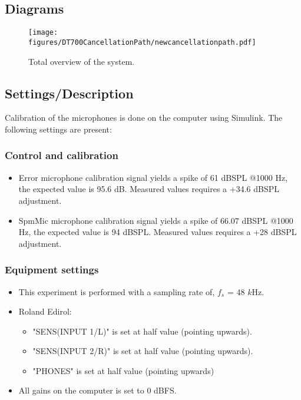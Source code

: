 \subsection{Diagrams}
\begin{figure}[H]
	\centering
	\texttt{[image: figures/DT700CancellationPath/newcancellationpath.pdf]}
	\caption{Total overview of the system.}
	\label{SchematicOverviewCP}
\end{figure}

\subsection{Settings/Description}
\label{SettingsCacellationPath}

Calibration of the microphones is done on the computer using Simulink. The following settings are present:

\subsubsection{Control and calibration}
\begin{itemize}
	\item Error microphone calibration signal yields a spike of 61 dBSPL @1000 Hz, the expected value is 95.6 dB. Measured values requires a +34.6 dBSPL adjustment.
	\item SpmMic microphone calibration signal yields a spike of 66.07 dBSPL @1000 Hz, the expected value is 94 dBSPL. Measured values requires a +28 dBSPL adjustment.
\end{itemize}


\subsubsection{Equipment settings}
\begin{itemize}
	\item This experiment is performed with a sampling rate of, $f_{s}$ = 48 $k$Hz.
	\item Roland Edirol:
		\begin{itemize}
			\item "SENS(INPUT 1/L)" is set at half value (pointing upwards).
			\item "SENS(INPUT 2/R)" is set at half value (pointing upwards).
			\item "PHONES" is set at half value (pointing upwards)
		\end{itemize}				
	\item All gains on the computer is set to 0 dBFS.
\end{itemize}


